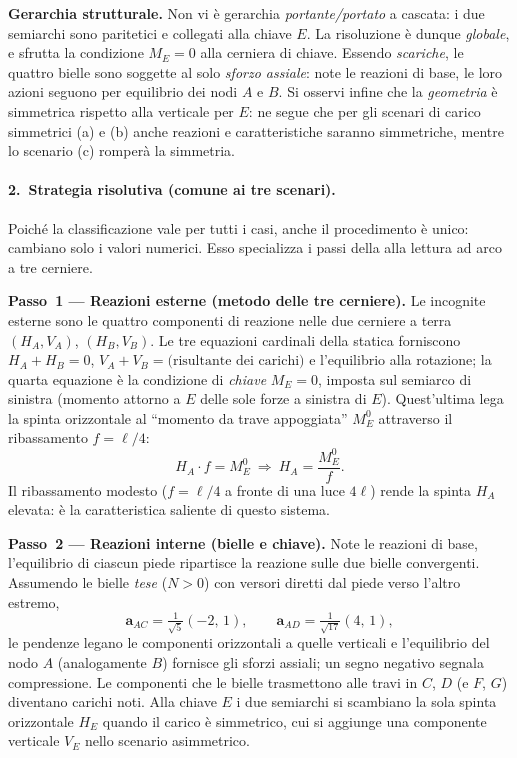 \begin{esercizio}
\begin{svolgimento}
	\medskip\noindent\textbf{Gerarchia strutturale.}
	Non vi è gerarchia \emph{portante/portato} a cascata: i due semiarchi
	sono paritetici e collegati alla chiave $E$. La risoluzione è
	dunque \emph{globale}, e sfrutta la condizione $M_E=0$ alla cerniera di
	chiave. Essendo \emph{scariche}, le quattro bielle sono soggette al solo
	\textit{sforzo assiale}: note le reazioni di base, le loro azioni seguono
	per equilibrio dei nodi $A$ e $B$. Si osservi infine che la
	\emph{geometria} è simmetrica rispetto alla verticale per $E$: ne segue
	che per gli scenari di carico simmetrici (a) e (b) anche reazioni e
	caratteristiche saranno simmetriche, mentre lo scenario (c) romperà la
	simmetria.
	
	\paragraph{2.~Strategia risolutiva (comune ai tre scenari).}
	Poiché la classificazione vale per tutti i casi, anche il procedimento è
	unico: cambiano solo i valori numerici. Esso specializza i passi della
	 alla lettura ad arco a tre cerniere.
	
	\medskip\noindent\textbf{Passo~1 --- Reazioni esterne (metodo delle tre
		cerniere).}
	Le incognite esterne sono le quattro componenti di reazione nelle due
	cerniere a terra $(H_A,V_A)$, $(H_B,V_B)$. Le tre equazioni cardinali
	della statica forniscono $H_A+H_B=0$, $V_A+V_B = \text{(risultante dei
		carichi)}$ e l'equilibrio alla rotazione; la quarta equazione è la
	condizione di \emph{chiave} $M_E=0$, imposta sul semiarco di sinistra
	(momento attorno a $E$ delle sole forze a sinistra di $E$). Quest'ultima
	lega la spinta orizzontale al ``momento da trave appoggiata'' $M_E^{0}$
	attraverso il ribassamento $f=\ell/4$:
	\[
	H_A\cdot f = M_E^{0}\ \Longrightarrow\ H_A=\frac{M_E^{0}}{f}.
	\]
	Il ribassamento modesto ($f=\ell/4$ a fronte di una luce $4\ell$) rende
	la spinta $H_A$ elevata: è la caratteristica saliente di questo sistema.
	
	\medskip\noindent\textbf{Passo~2 --- Reazioni interne (bielle e chiave).}
	Note le reazioni di base, l'equilibrio di ciascun piede ripartisce la
	reazione sulle due bielle convergenti. Assumendo le bielle \emph{tese}
	($N>0$) con versori diretti dal piede verso l'altro estremo,
	\[
	\mathbf a_{AC}=\tfrac{1}{\sqrt5}(-2,\,1),\qquad
	\mathbf a_{AD}=\tfrac{1}{\sqrt{17}}(4,\,1),
	\]
	le pendenze legano le componenti orizzontali a quelle verticali e
	l'equilibrio del nodo $A$ (analogamente $B$) fornisce gli sforzi assiali;
	un segno negativo segnala compressione. Le componenti che le bielle
	trasmettono alle travi in $C$, $D$ (e $F$, $G$) diventano carichi noti.
	Alla chiave $E$ i due semiarchi si scambiano la sola spinta orizzontale
	$H_E$ quando il carico è simmetrico, cui si aggiunge una componente
	verticale $V_E$ nello scenario asimmetrico.
	

\end{svolgimento}
\end{esercizio}

